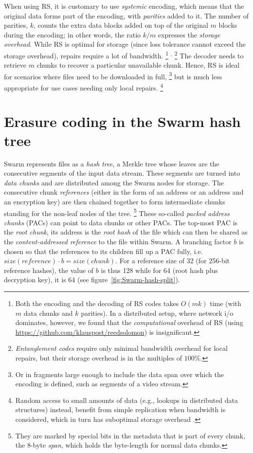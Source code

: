 \documentclass[manuscript,screen,review]{acmart}
\begin{document}
When using RS, it is customary to use \emph{systemic} encoding, which means that the original data forms part of the encoding, with \emph{parities} added to it. The number of parities, $k$, counts the extra data blocks added on top of the original $m$  blocks  during the encoding; in other words, the ratio $k/m$ expresses the \emph{storage overhead}. While RS is optimal for storage (since loss tolerance cannot exceed the storage overhead), repairs require a lot of bandwidth.%
%
\footnote{Both the encoding and the decoding of RS codes takes $O(mk)$ time (with $m$ data chunks and $k$ parities). In a distributed setup, where network i/o dominates, however, we found that the \emph{computational} overhead of RS (using \url{https://github.com/klauspost/reedsolomon}) is insignificant.}%
$^,$%
\footnote{\emph{Entanglement codes} \citep{estrada2018alpha, estrada2019building} require only minimal bandwidth overhead for local repairs, but their storage overhead is in the multiples of $100\%$.}
%
The decoder needs to retrieve $m$ chunks to recover a particular unavailable chunk.
Hence, RS is ideal for scenarios where files need to be downloaded in full,%
%
\footnote{Or in fragments large enough to include the data span over which the encoding is defined, such as segments of a video stream.}
%
 but is much less appropriate for use cases needing only local repairs.%
%
\footnote{Random access to small amounts of data (e.g., lookups in distributed data structures) instead, benefit from simple replication when bandwidth  is considered, which in turn has suboptimal storage overhead \citep{weatherspoon2002erasure}.}


\section{Erasure coding in the Swarm hash tree}
\label{sec:erasure}

Swarm represents files as a \emph{hash tree}, a Merkle tree \citep{merkle1980protocols} whose leaves are the consecutive segments of the input data stream. These segments are turned into \emph{data chunks} and are distributed among the Swarm nodes for storage. The consecutive chunk \emph{references} (either in the form of an address or an address and an encryption key) are then chained together to form intermediate chunks standing for the non-leaf nodes of the tree.%
%
\footnote{They are marked by special bits in the metadata that is part of every chunk, the 8-byte \emph{span}, which holds the byte-length for normal data chunks.}
%
These so-called \emph{packed address chunks} (PACs) can point to data chunks or other PACs. The top-most PAC is the \emph{root chunk}, its address is the \emph{root hash} of the file which can then be shared as the \emph{content-addressed reference} to the file within Swarm. 
A branching factor $b$ is chosen so that the references to its children fill up a PAC fully, i.e. $\mathit{size}(\mathit{reference})\cdot b = \mathit{size}(\mathit{chunk})$.
For a reference size of 32 (for 256-bit reference hashes), the value of $b$ is thus 128 while for 64 (root hash plus decryption key), it is 64 (see figure~\ref{fig:Swarm-hash-split}).
\end{document}
